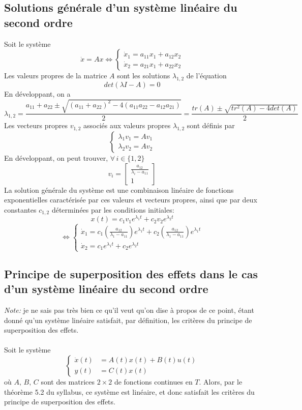 \documentclass[a4paper]{article}
\begin{document}
\subsection{Solutions générale d'un système linéaire du second ordre}
Soit le système
\[\dot x=Ax\Leftrightarrow
	\begin{cases}
		\dot x_1 = a_{11}x_1 + a_{12}x_2\\
		\dot x_2 = a_{21}x_1 + a_{22}x_2
	\end{cases}
\]
Les valeurs propres de la matrice \(A\) sont les solutions \(\lambda_{1,2}\) de l'équation
\[det(\lambda I-A)=0\]
En développant, on a
\[\lambda_{1,2} = \frac{a_{11}+a_{22} \pm \sqrt{(a_{11}+a_{22})^2 - 4(a_{11}a_{22} - a_{12}a_{21})}}{2}
	=\frac{tr(A)\pm\sqrt{tr^2(A) - 4det(A)}}{2}
\]
Les vecteurs propres \(v_{1,2}\) associés aux valeurs propres \(\lambda_{1,2}\) sont définis par
\[\begin{cases}
	\lambda_1 v_1=Av_1\\
	\lambda_2 v_2=Av_2
\end{cases}\]
En développant, on peut trouver, \(\forall\, i\in\{1, 2\}\)
\[v_i=\begin{bmatrix}
	\frac{a_{12}}{\lambda_i - a_{11}}\\
	1
\end{bmatrix}
\]
La solution générale du système est une combinaison linéaire de fonctions
exponentielles caractérisée par ces valeurs et vecteurs propres, ainsi que par
deux constantes \(c_{1,2}\) déterminées par les conditions initiales:
\[x(t)=c_1 v_1 e^{\lambda_1 t} + c_2 v_2 e^{\lambda_2 t}\]
\[\Leftrightarrow
\begin{cases}
	\dot x_1 = c_1 \left( \frac{a_12}{\lambda_1-a_{11}}\right) e^{\lambda_1 t} +
	           c_2 \left( \frac{a_12}{\lambda_1-a_{11}}\right) e^{\lambda_1 t} \\
	\dot x_2 = c_1 e^{\lambda_1 t} + c_2 e^{\lambda_2 t}
\end{cases}
\]
\subsection{Principe de superposition des effets dans le cas d'un système
linéaire du second ordre}
\emph{Note:} je ne sais pas très bien ce qu'il veut qu'on dise à propos de ce
point, étant donné qu'un système linéaire satisfait, par définition, les
critères du principe de superposition des effets.
\paragraph{}
Soit le système
\[
	\begin{cases}
		\dot x(t)&= A(t)x(t) + B(t)u(t)\\
		y(t)&=C(t)x(t)
	\end{cases}
\]
où \(A,\,B,\,C\) sont des matrices \(2\times 2\) de fonctions continues en
\(T\). Alors, par le théorème 5.2 du syllabus, ce système est linéaire, et donc
satisfait les critères du principe de superposition des effets.
\end{document}
